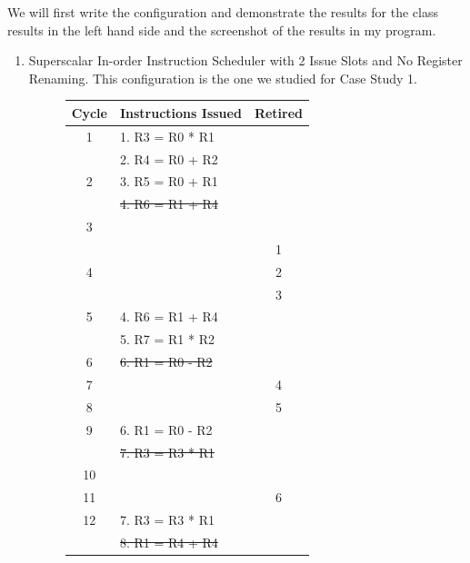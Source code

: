 \documentclass{article}
\begin{document}
We will first write the configuration and demonstrate the results for the class results in the left hand side and the screenshot of the results in my program.
\begin{enumerate}
    \item Superscalar In-order Instruction Scheduler with 2 Issue Slots and No Register Renaming. This configuration is the one we studied for Case Study 1.
    \begin{figure}[H]
        \centering{}
        \begin{minipage}[t]{0.45\textwidth}
            \centering
            \renewcommand{\arraystretch}{0.8} %
            \setlength{\tabcolsep}{3pt} %
            \begin{tabular}{|c|p{3.4cm}|c|}
                \hline
                \textbf{Cycle} & \textbf{Instructions Issued} & \textbf{Retired} \\ \hline
                1 & 1. R3 = R0 * R1 & \\ 
                  & 2. R4 = R0 + R2 & \\ \hline
                2 & 3. R5 = R0 + R1 & \\ 
                  & \sout{4. R6 = R1 + R4} & \\ \hline
                3 &                 & \\ \hline
                 &                 & 1 \\ 
                4 &                 & 2 \\ 
                 &                 & 3 \\ \hline
                5 & 4. R6 = R1 + R4 & \\
                  & 5. R7 = R1 * R2 & \\ \hline 
                6 & \sout{6. R1 = R0 - R2} & \\ \hline
                7 & & 4 \\ \hline 
                8 & & 5 \\ \hline 
                9 & 6. R1 = R0 - R2 & \\ \hline
                  & \sout{7. R3 = R3 * R1} & \\ \hline
                10 & & \\ \hline 
                11 & & 6 \\ \hline 
                12 & 7. R3 = R3 * R1 & \\ \hline 
                & \sout{8. R1 = R4 + R4} & \\ \hline

\end{tabular}
\end{minipage}
\end{figure}
\end{enumerate}
\end{document}
